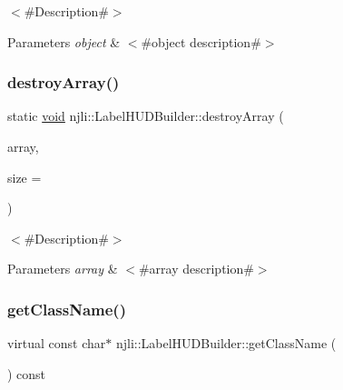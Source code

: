 $<$\#\+Description\#$>$


\begin{DoxyParams}{Parameters}
{\em object} & $<$\#object description\#$>$ \\
\hline
\end{DoxyParams}
\mbox{\label{classnjli_1_1_label_h_u_d_builder_a4a8ec57b63478657ff1869393d242b79}} 
\subsubsection{\texorpdfstring{destroy\+Array()}{destroyArray()}}
{\footnotesize\ttfamily static \mbox{\hyperlink{_thread_8h_af1e856da2e658414cb2456cb6f7ebc66}{void}} njli\+::\+Label\+H\+U\+D\+Builder\+::destroy\+Array (\begin{DoxyParamCaption}\item[{\mbox{\hyperlink{classnjli_1_1_label_h_u_d_builder}{Label\+H\+U\+D\+Builder}} $\ast$$\ast$}]{array,  }\item[{const \mbox{\hyperlink{_util_8h_a10e94b422ef0c20dcdec20d31a1f5049}{u32}}}]{size = {} }\end{DoxyParamCaption})\hspace{0.3cm}{\ttfamily [static]}}

$<$\#\+Description\#$>$


\begin{DoxyParams}{Parameters}
{\em array} & $<$\#array description\#$>$ \\
\hline
\end{DoxyParams}
\mbox{\label{classnjli_1_1_label_h_u_d_builder_a065dab35d2ad65345003a168a6748cb4}} 
\subsubsection{\texorpdfstring{get\+Class\+Name()}{getClassName()}}
{\footnotesize\ttfamily virtual const char$\ast$ njli\+::\+Label\+H\+U\+D\+Builder\+::get\+Class\+Name (\begin{DoxyParamCaption}{ }\end{DoxyParamCaption}) const\hspace{0.3cm}{\ttfamily [virtual]}}

